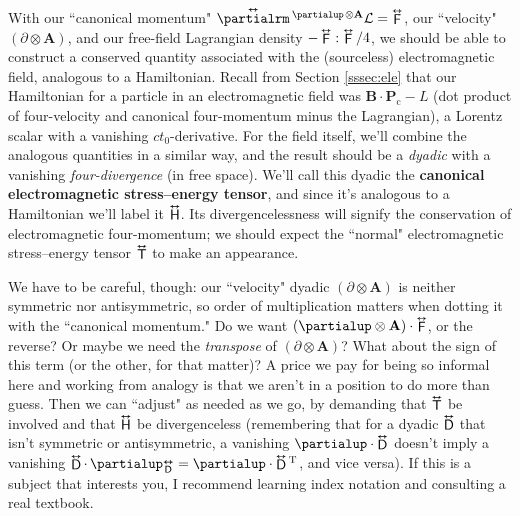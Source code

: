 \documentclass[12pt]{article}
\renewcommand{\vv}[1]{\mathbf{#1}}
\newcommand{\tightoverset}[2]{%
  \mathop{#2}\limits^{\vbox to -.5ex{\kern-0.75ex\hbox{$#1$}\vss}}}
\newcommand{\inlinedy}[1]{\tightoverset{\text{\tiny$\bm\leftrightarrow$}}{#1}}
\newcommand{\fnoverset}[2]{%
  \mathop{#2}\limits^{\vbox to -.5ex{\kern-0.85ex\hbox{$#1$}\vss}}}
\newcommand{\footnotedy}[1]{\fnoverset{\text{\tiny$\bm\leftrightarrow$}}{#1}}
\begin{document}
With our ``canonical momentum" $\inlinedy{\partialrm} {}^{\partialup \mkern2mu \otimes \vv A} \mathcal{L} = \inlinedy{\mathsf{F}}$, our ``velocity" $( \partialup \otimes \vv A )$, and our free-field Lagrangian density $- \inlinedy{\mathsf{F}} : \inlinedy{\mathsf{F}} / 4$, we should be able to construct a conserved quantity associated with the (sourceless) electromagnetic field, analogous to a Hamiltonian. Recall from Section \ref{sssec:ele} that our Hamiltonian for a particle in an electromagnetic field was $\vv B \cdot \vv P_{\mathrm{c}} - L$ (dot product of four-velocity and canonical four-momentum minus the Lagrangian), a Lorentz scalar with a vanishing $ct_0$-derivative. For the field itself, we'll combine the analogous quantities in a similar way, and the result should be a \emph{dyadic} with a vanishing \emph{four-divergence} (in free space). We'll call this dyadic the \textbf{canonical electromagnetic stress--energy tensor}, and since it's analogous to a Hamiltonian we'll label it $\inlinedy{\mathsf{H}}$. Its divergencelessness will signify the conservation of electromagnetic four-momentum; we should expect the ``normal" electromagnetic stress--energy tensor $\inlinedy{\mathsf{T}}$ to make an appearance.

We have to be careful, though: our ``velocity" dyadic $( \partialup \otimes \vv A )$ is neither symmetric nor antisymmetric, so order of multiplication matters when dotting it with the ``canonical momentum." Do we want $(\partialup \otimes \vv A) \cdot \inlinedy{\mathsf{F}}$, or the reverse? Or maybe we need the \emph{transpose} of $(\partialup \otimes \vv A)$? What about the sign of this term (or the other, for that matter)? A price we pay for being so informal here and working from analogy is that we aren't in a position to do more than guess. Then we can ``adjust" as needed as we go, by demanding that $\inlinedy{\mathsf{T}}$ be involved and that $\inlinedy{\mathsf{H}}$ be divergenceless (remembering that for a dyadic $\inlinedy{\mathsf{D}}$ that isn't symmetric or antisymmetric, a vanishing $\partialup \cdot \inlinedy{\mathsf{D}}$ doesn't imply a vanishing $\inlinedy{\mathsf{D}} \cdot \, \partialup _{\footnotedy{\mathsf{D}}} = \partialup \cdot \inlinedy{\mathsf{D}} {}^{\mathrm{T}} $, and vice versa). If this is a subject that interests you, I recommend learning index notation and consulting a real textbook.
\end{document}
